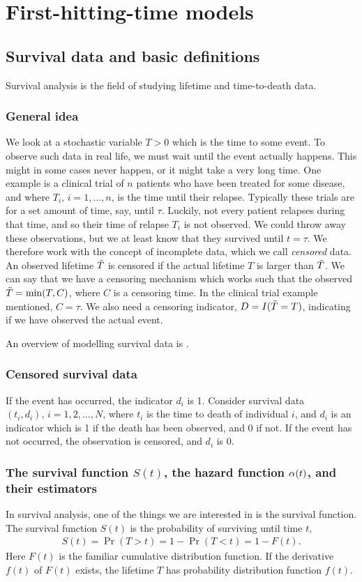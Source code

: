 \chapter{First-hitting-time models}

\section{Survival data and basic definitions}
Survival analysis is the field of studying lifetime and time-to-death data. 

\subsection{General idea}
We look at a stochastic variable $T>0$ which is the time to some event. To observe such data in real life, we must wait until the event actually happens. This might in some cases never happen, or it might take a very long time. One example is a clinical trial of $n$ patients who have been treated for some disease, and where $T_i$, $i=1,\ldots,n$, is the time until their relapse. Typically these trials are for a set amount of time, say, until $\tau$. Luckily, not every patient relapses during that time, and so their time of relapse $T_i$ is not observed. We could throw away these observations, but we at least know that they survived until $t=\tau$. We therefore work with the concept of incomplete data, which we call \textit{censored} data. An observed lifetime $\tilde{T}$ is censored if the actual lifetime $T$ is larger than $\tilde{T}$. We can say that we have a censoring mechanism which works such that the observed $\tilde{T}=\min(T, C)$, where $C$ is a censoring time. In the clinical trial example mentioned, $C=\tau$. We also need a censoring indicator, $D=I(\tilde{T}=T)$, indicating if we have observed the actual event.

An overview of modelling survival data is \citet{ABG}.

\subsection{Censored survival data}
If the event has occurred, the indicator $d_i$ is 1.
Consider survival data $(t_i,d_i),\,i=1,2,\ldots,N$, where $t_i$ is the time to death of individual $i$, and $d_i$ is an indicator which is 1 if the death has been observed, and 0 if not.
If the event has not occurred, the observation is censored, and $d_i$ is 0.

\subsection{The survival function $S(t)$, the hazard function $\alpha(t)$, and their estimators}
In survival analysis, one of the things we are interested in is the survival function. The survival function $S(t)$ is the probability of surviving until time $t$,
\begin{align*}
    S(t)=\Pr(T>t)=1-\Pr(T<t)=1-F(t).
\end{align*}
Here $F(t)$ is the familiar cumulative distribution function. If the derivative $f(t)$ of $F(t)$ exists, the lifetime $T$ has probability distribution function $f(t)$.

